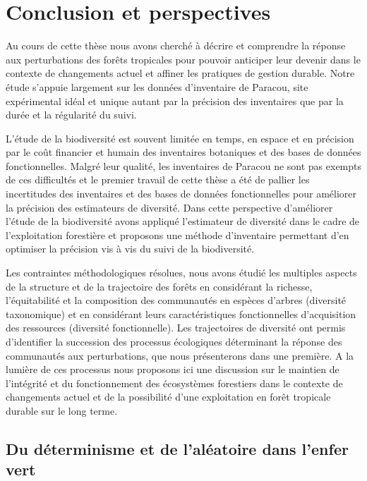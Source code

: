 \documentclass[
  11pt,
  french,
  A4paper,
  extrafontsizes,onecolumn,openright
  ]{memoir}
\begin{document}
\chapter{Conclusion et perspectives}\label{conclusion-et-perspectives}

Au cours de cette thèse nous avons cherché à décrire et comprendre la
réponse aux perturbations des forêts tropicales pour pouvoir anticiper
leur devenir dans le contexte de changements actuel et affiner les
pratiques de gestion durable. Notre étude s'appuie largement sur les
données d'inventaire de Paracou, site expérimental idéal et unique
autant par la précision des inventaires que par la durée et la
régularité du suivi.

L'étude de la biodiversité est souvent limitée en temps, en espace et en
précision par le coût financier et humain des inventaires botaniques et
des bases de données fonctionnelles. Malgré leur qualité, les
inventaires de Paracou ne sont pas exempts de ces difficultés et le
premier travail de cette thèse a été de pallier les incertitudes des
inventaires et des bases de données fonctionnelles pour améliorer la
précision des estimateurs de diversité. Dans cette perspective
d'améliorer l'étude de la biodiversité avons appliqué l'estimateur de
diversité dans le cadre de l'exploitation forestière et proposons une
méthode d'inventaire permettant d'en optimiser la précision vis à vis du
suivi de la biodiversité.

Les contraintes méthodologiques résolues, nous avons étudié les
multiples aspects de la structure et de la trajectoire des forêts en
considérant la richesse, l'équitabilité et la composition des
communautés en espèces d'arbres (diversité taxonomique) et en
considérant leurs caractéristiques fonctionnelles d'acquisition des
ressources (diversité fonctionnelle). Les trajectoires de diversité ont
permis d'identifier la succession des processus écologiques déterminant
la réponse des communautés aux perturbations, que nous présenterons dans
une première. A la lumière de ces processus nous proposons ici une
discussion sur le maintien de l'intégrité et du fonctionnement des
écosystèmes forestiers dans le contexte de changements actuel et de la
possibilité d'une exploitation en forêt tropicale durable sur le long
terme.

\section{Du déterminisme et de l'aléatoire dans l'enfer
vert}\label{du-determinisme-et-de-laleatoire-dans-lenfer-vert}
\end{document}
